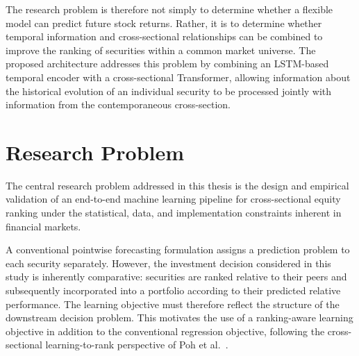 


The research problem is therefore not simply to determine whether a flexible model can predict future stock returns. Rather, it is to determine whether temporal information and cross-sectional relationships can be combined to improve the ranking of securities within a common market universe. The proposed architecture addresses this problem by combining an \acs{LSTM}-based temporal encoder with a cross-sectional Transformer, allowing information about the historical evolution of an individual security to be processed jointly with information from the contemporaneous cross-section.

\section{Research Problem} \label{sec:research-problem}
The central research problem addressed in this thesis is the design and empirical validation of an end-to-end machine learning pipeline for cross-sectional equity ranking under the statistical, data, and implementation constraints inherent in financial markets.

\medskip

A conventional pointwise forecasting formulation assigns a prediction problem to each security separately. However, the investment decision considered in this study is inherently comparative: securities are ranked relative to their peers and subsequently incorporated into a portfolio according to their predicted relative performance. The learning objective must therefore reflect the structure of the downstream decision problem. This motivates the use of a ranking-aware learning objective in addition to the conventional regression objective, following the cross-sectional learning-to-rank perspective of Poh et al.~\cite{Poh2021}.


